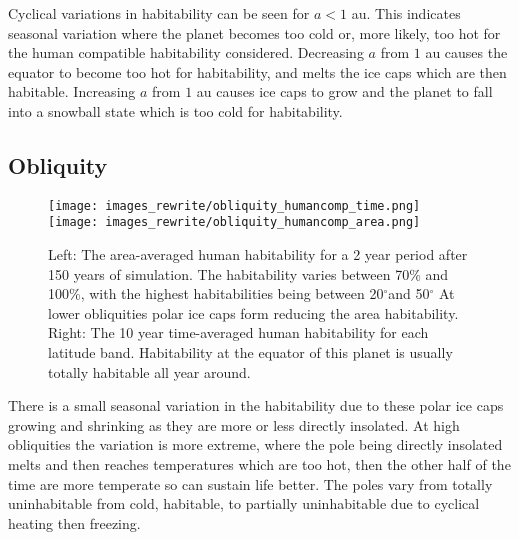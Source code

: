 \documentclass[12pt, onecolumn]{revtex4-2}    %
\newcommand{\degrees}{\ensuremath{^{\circ}}}
\begin{document}
Cyclical variations in habitability can be seen for $a < 1$ au.
This indicates seasonal variation where the planet becomes too cold or, more likely, too hot for the human compatible habitability considered.
Decreasing $a$ from $1$ au causes the equator to become too hot for habitability, and melts the ice caps which are then habitable.
Increasing $a$ from $1$ au causes ice caps to grow and the planet to fall into a snowball state which is too cold for habitability.

\subsection{Obliquity} \label{ssec:qualitative_obliquity}
\begin{figure}
  \texttt{[image: images\_rewrite/obliquity\_humancomp\_time.png]}
  \texttt{[image: images\_rewrite/obliquity\_humancomp\_area.png]}
  \caption{
    Left: The area-averaged human habitability for a 2 year period after 150 years of simulation.
    The habitability varies between 70\% and 100\%, with the highest habitabilities being between 20\degrees and 50\degrees
    At lower obliquities polar ice caps form reducing the area habitability.
    Right: The 10 year time-averaged human habitability for each latitude band.
    Habitability at the equator of this planet is usually totally habitable all year around.
  }
  \label{fig:qualitative_obliquity}
\end{figure}

There is a small seasonal variation in the habitability due to these polar ice caps growing and shrinking as they are more or less directly insolated.
At high obliquities the variation is more extreme, where the pole being directly insolated melts and then reaches temperatures which are too hot, then the other half of the time are more temperate so can sustain life better.
The poles vary from totally uninhabitable from cold, habitable, to partially uninhabitable due to cyclical heating then freezing.

\end{document}
